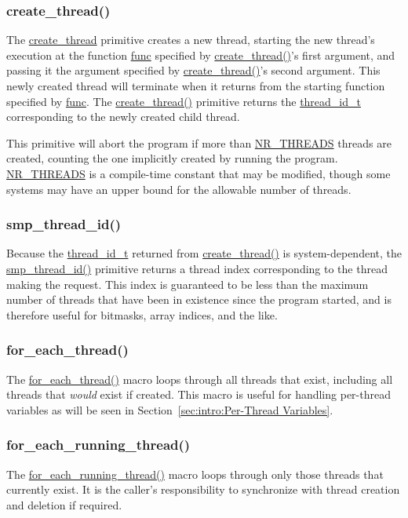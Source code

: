 \subsubsection{create\_thread()}

The \url{create_thread} primitive creates a new thread,
starting the new thread's execution
at the function \url{func} specified by \url{create_thread()}'s
first argument, and passing it the argument specified by
\url{create_thread()}'s second argument.
This newly created thread will terminate when it returns from the
starting function specified by \url{func}.
The \url{create_thread()} primitive returns the \url{thread_id_t}
corresponding to the newly created child thread.

This primitive will abort the program if more than \url{NR_THREADS}
threads are created, counting the one implicitly created by running
the program.
\url{NR_THREADS} is a compile-time constant that may be modified,
though some systems may have an upper bound for the allowable number
of threads.

\subsubsection{smp\_thread\_id()}

Because the \url{thread_id_t} returned from \url{create_thread()} is
system-dependent, the \url{smp_thread_id()} primitive returns a thread
index corresponding to the thread making the request.
This index is guaranteed to be less than the maximum number of threads
that have been in existence since the program started,
and is therefore useful for bitmasks, array indices, and
the like.

\subsubsection{for\_each\_thread()}

The \url{for_each_thread()} macro loops through all threads that exist,
including all threads that \emph{would} exist if created.
This macro is useful for handling per-thread variables as will be
seen in Section~\ref{sec:intro:Per-Thread Variables}.

\subsubsection{for\_each\_running\_thread()}

The \url{for_each_running_thread()}
macro loops through only those threads that currently exist.
It is the caller's responsibility to synchronize with thread
creation and deletion if required.

